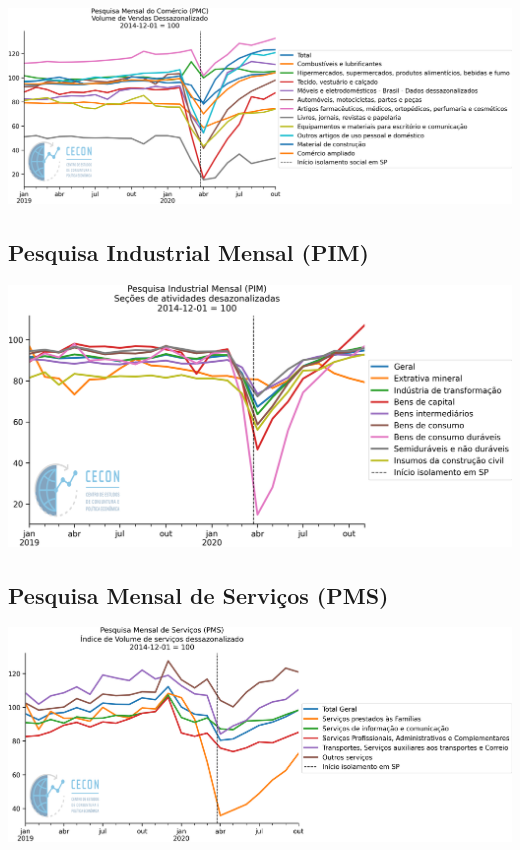 \documentclass{SelfArx}
\begin{document}
\begin{center}
\includegraphics[width=.9\linewidth]{./figs/Setoriais/PMC_IBGE.png}
\end{center}


\subsection*{Pesquisa Industrial Mensal (PIM)}
\label{sec:org5c28cb7}

\begin{center}
\includegraphics[width=.9\linewidth]{./figs/Setoriais/PIM_IBGE.png}
\end{center}


\subsection*{Pesquisa Mensal de Serviços (PMS)}
\label{sec:org038431f}

\begin{center}
\includegraphics[width=.9\linewidth]{./figs/Setoriais/PMS_IBGE.png}
\end{center}
\end{document}
